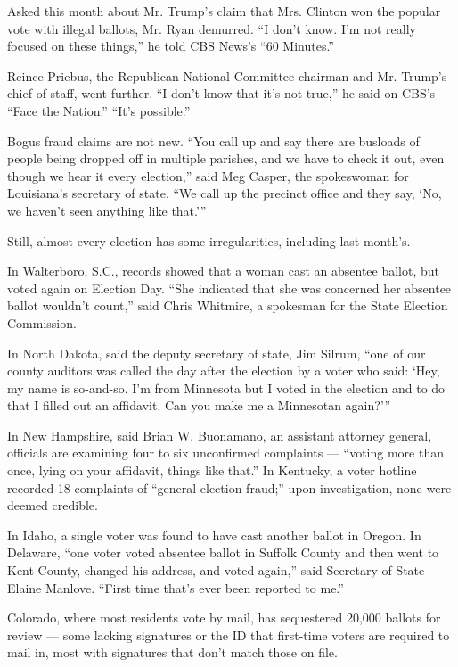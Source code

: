 Asked this month about Mr. Trump's claim that Mrs. Clinton won the
popular vote with illegal ballots, Mr. Ryan demurred. ``I don't know.
I'm not really focused on these things,'' he told CBS News's ``60
Minutes.''

Reince Priebus, the Republican National Committee chairman and Mr.
Trump's chief of staff, went further. ``I don't know that it's not
true,'' he said on CBS's ``Face the Nation.'' ``It's possible.''

Bogus fraud claims are not new. ``You call up and say there are busloads
of people being dropped off in multiple parishes, and we have to check
it out, even though we hear it every election,'' said Meg Casper, the
spokeswoman for Louisiana's secretary of state. ``We call up the
precinct office and they say, `No, we haven't seen anything like
that.'''

Still, almost every election has some irregularities, including last
month's.

In Walterboro, S.C., records showed that a woman cast an absentee
ballot, but voted again on Election Day. ``She indicated that she was
concerned her absentee ballot wouldn't count,'' said Chris Whitmire, a
spokesman for the State Election Commission.

In North Dakota, said the deputy secretary of state, Jim Silrum, ``one
of our county auditors was called the day after the election by a voter
who said: `Hey, my name is so-and-so. I'm from Minnesota but I voted in
the election and to do that I filled out an affidavit. Can you make me a
Minnesotan again?'''

In New Hampshire, said Brian W. Buonamano, an assistant attorney
general, officials are examining four to six unconfirmed complaints ---
``voting more than once, lying on your affidavit, things like that.'' In
Kentucky, a voter hotline recorded 18 complaints of ``general election
fraud;'' upon investigation, none were deemed credible.

In Idaho, a single voter was found to have cast another ballot in
Oregon. In Delaware, ``one voter voted absentee ballot in Suffolk County
and then went to Kent County, changed his address, and voted again,''
said Secretary of State Elaine Manlove. ``First time that's ever been
reported to me.''

Colorado, where most residents vote by mail, has sequestered 20,000
ballots for review --- some lacking signatures or the ID that first-time
voters are required to mail in, most with signatures that don't match
those on file.

